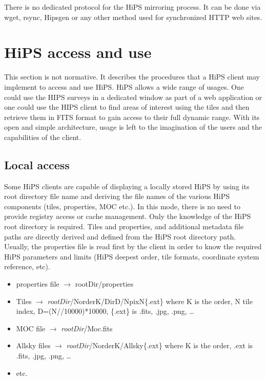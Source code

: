 \documentclass[11pt,a4paper]{ivoa}
\begin{document}
There is no dedicated protocol for the HiPS mirroring process. It can be done via wget, rsync, Hipsgen or any other method used for synchronized HTTP web sites. 


\section{HiPS access and use}
\label{sec:use}

This section is not normative. It describes the procedures that a HiPS client may implement to access and use HiPS.
HiPS allows a wide range of usages. One could use the HIPS surveys in a dedicated window as part of a web application or one could use the HIPS client to find areas of interest using the tiles and then retrieve them in FITS format to gain access to their full dynamic range. With its open and simple architecture, usage is left to the imagination of the users and the capabilities of the client.

\subsection{Local access}

Some HiPS clients are capable of displaying a locally stored HiPS by using its root directory file name and deriving the file names of the various HiPS components (tiles, properties, MOC etc.). In this mode, there is no need to provide registry access or cache management. Only the knowledge of the HiPS root directory is required. Tiles and properties, and additional metadata file paths are directly derived and defined from the HiPS root directory path. Usually, the properties file is read first by the client in order to know the required HiPS parameters and limits (HiPS deepest order, tile formats, coordinate system reference, etc).

\begin{itemize}
\item properties file $\rightarrow$ rootDir/properties
\item Tiles $\rightarrow$ {\em rootDir}/NorderK/DirD/NpixN\{.ext\}
where K is the order, N tile index, D=(N//10000)*10000,
\{.ext\} is .fits, .jpg, .png, …
\item MOC file $\rightarrow$ {\em rootDir}/Moc.fits
\item Allsky files $\rightarrow$ {\em rootDir}/NorderK/Allsky\{.ext\}
where K is the order, {.ext} is .fits, .jpg, .png, …
\item etc.
\end{itemize}
\end{document}

